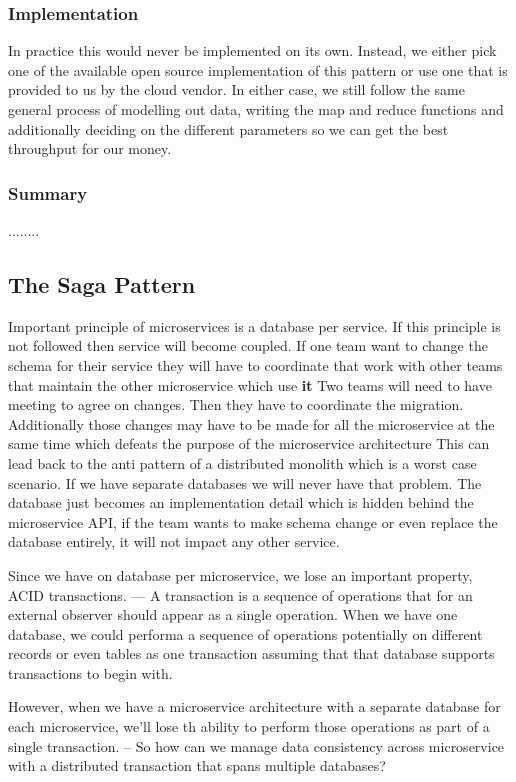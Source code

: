 \documentclass[a4paper, 11pt]{book}
\begin{document}
    \subsubsection{Implementation}
    In practice this would never be implemented on its own.
    Instead, we either pick one of the available open source implementation of this pattern or use one that is provided to us by the cloud vendor.
    In either case, we still follow the same general process of modelling out data, writing the map and reduce functions and additionally deciding on the different parameters so we can get the best throughput for our money.

    \subsubsection{Summary}
    ........

    \subsection{The Saga Pattern}
    Important principle of microservices is a database per service.
    If this principle is not followed then service will become coupled.
    If one team want to change the schema for their service they will have to coordinate that work with other teams that maintain the other microservice which use \textbf{it}
    Two teams will need to have meeting to agree on changes.
    Then they have to coordinate the migration.
    Additionally those changes may have to be made for all the microservice at the same time which defeats the purpose of the microservice architecture
    This can lead back to the anti pattern of a distributed monolith which is a worst case scenario.
    If we have separate databases we will never have that problem.
    The database just becomes an implementation detail which is hidden behind the microservice API, if the team wants to make schema change or even replace the database entirely, it will not impact any other service.

    Since we have on database per microservice, we lose an important property, ACID transactions.
    --- A transaction is a sequence of operations that for an external observer should appear as a single operation.
    When we have one database, we could performa a sequence of operations potentially on different records or even tables as one transaction assuming that that database supports transactions to begin with.

    However, when we have a microservice architecture with a separate database for each microservice, we'll lose th ability to perform those operations as part of a single transaction.
    -- So how can we manage data consistency across microservice with a distributed transaction that spans multiple databases?
\end{document}
